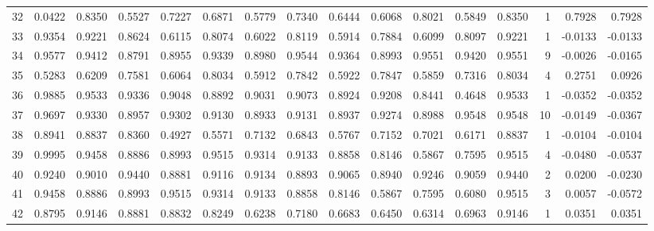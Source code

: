\begin{tabular}{lrrrrrrrrrrrrrrr}
32  &      0.0422 &  0.8350 &  0.5527 &  0.7227 &  0.6871 &  0.5779 &  0.7340 &  0.6444 &  0.6068 &  0.8021 &   0.5849 &     0.8350 &      1 &                    0.7928 &                     0.7928 \\
33  &      0.9354 &  0.9221 &  0.8624 &  0.6115 &  0.8074 &  0.6022 &  0.8119 &  0.5914 &  0.7884 &  0.6099 &   0.8097 &     0.9221 &      1 &                   -0.0133 &                    -0.0133 \\
34  &      0.9577 &  0.9412 &  0.8791 &  0.8955 &  0.9339 &  0.8980 &  0.9544 &  0.9364 &  0.8993 &  0.9551 &   0.9420 &     0.9551 &      9 &                   -0.0026 &                    -0.0165 \\
35  &      0.5283 &  0.6209 &  0.7581 &  0.6064 &  0.8034 &  0.5912 &  0.7842 &  0.5922 &  0.7847 &  0.5859 &   0.7316 &     0.8034 &      4 &                    0.2751 &                     0.0926 \\
36  &      0.9885 &  0.9533 &  0.9336 &  0.9048 &  0.8892 &  0.9031 &  0.9073 &  0.8924 &  0.9208 &  0.8441 &   0.4648 &     0.9533 &      1 &                   -0.0352 &                    -0.0352 \\
37  &      0.9697 &  0.9330 &  0.8957 &  0.9302 &  0.9130 &  0.8933 &  0.9131 &  0.8937 &  0.9274 &  0.8988 &   0.9548 &     0.9548 &     10 &                   -0.0149 &                    -0.0367 \\
38  &      0.8941 &  0.8837 &  0.8360 &  0.4927 &  0.5571 &  0.7132 &  0.6843 &  0.5767 &  0.7152 &  0.7021 &   0.6171 &     0.8837 &      1 &                   -0.0104 &                    -0.0104 \\
39  &      0.9995 &  0.9458 &  0.8886 &  0.8993 &  0.9515 &  0.9314 &  0.9133 &  0.8858 &  0.8146 &  0.5867 &   0.7595 &     0.9515 &      4 &                   -0.0480 &                    -0.0537 \\
40  &      0.9240 &  0.9010 &  0.9440 &  0.8881 &  0.9116 &  0.9134 &  0.8893 &  0.9065 &  0.8940 &  0.9246 &   0.9059 &     0.9440 &      2 &                    0.0200 &                    -0.0230 \\
41  &      0.9458 &  0.8886 &  0.8993 &  0.9515 &  0.9314 &  0.9133 &  0.8858 &  0.8146 &  0.5867 &  0.7595 &   0.6080 &     0.9515 &      3 &                    0.0057 &                    -0.0572 \\
42  &      0.8795 &  0.9146 &  0.8881 &  0.8832 &  0.8249 &  0.6238 &  0.7180 &  0.6683 &  0.6450 &  0.6314 &   0.6963 &     0.9146 &      1 &                    0.0351 &                     0.0351 \\

\end{tabular}
